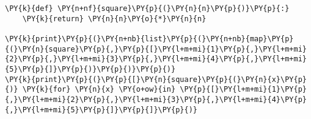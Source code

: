 \begin{Verbatim}[commandchars=\\\{\}]
\PY{k}{def} \PY{n+nf}{square}\PY{p}{(}\PY{n}{n}\PY{p}{)}\PY{p}{:}
    \PY{k}{return} \PY{n}{n}\PY{o}{*}\PY{n}{n}

\PY{k}{print}\PY{p}{(}\PY{n+nb}{list}\PY{p}{(}\PY{n+nb}{map}\PY{p}{(}\PY{n}{square}\PY{p}{,}\PY{p}{[}\PY{l+m+mi}{1}\PY{p}{,}\PY{l+m+mi}{2}\PY{p}{,}\PY{l+m+mi}{3}\PY{p}{,}\PY{l+m+mi}{4}\PY{p}{,}\PY{l+m+mi}{5}\PY{p}{]}\PY{p}{)}\PY{p}{)}\PY{p}{)}
\PY{k}{print}\PY{p}{(}\PY{p}{[}\PY{n}{square}\PY{p}{(}\PY{n}{x}\PY{p}{)} \PY{k}{for} \PY{n}{x} \PY{o+ow}{in} \PY{p}{[}\PY{l+m+mi}{1}\PY{p}{,}\PY{l+m+mi}{2}\PY{p}{,}\PY{l+m+mi}{3}\PY{p}{,}\PY{l+m+mi}{4}\PY{p}{,}\PY{l+m+mi}{5}\PY{p}{]}\PY{p}{]}\PY{p}{)}
\end{Verbatim}

